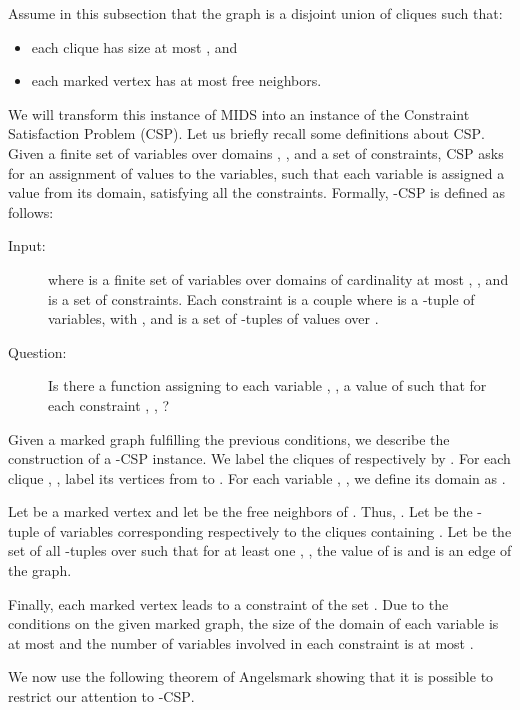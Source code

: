 \documentclass[a4paper,10pt]{article}
\theoremstyle{plain}
\theoremstyle{definition}
\theoremstyle{remark}
\newcommand{\MIDSpb}{\textsc{MIDS}\xspace}
\newcommand{\CSPpb}{\textsc{CSP}\xspace}
\begin{document}
Assume in this subsection that the graph  is a disjoint union of cliques such that:
\begin{itemize}
\item each clique has size at most , and
\item each marked vertex has at most  free neighbors.
\end{itemize}

We will transform this instance  of \MIDSpb into an instance
 of the Constraint Satisfaction Problem (\CSPpb). Let us
briefly recall some definitions about \CSPpb.
Given a finite set  of  variables over domains ,
, and a set  of  constraints, \CSPpb asks for
an assignment of values to the variables, such that each variable is assigned a value from its domain,
satisfying all the constraints.
Formally, -\CSPpb is defined as follows:



\begin{description}
\item[Input:]  where 
is a finite set of variables over domains  of
cardinality at most , ,
and  is a set of constraints.
Each constraint  is a couple 
where  is a -tuple of variables, with ,
and  is a set of -tuples of values over .

\item[Question:] Is there a function  assigning to each variable , ,
a value of  such that for each constraint , ,
 ?
\end{description}


Given a marked graph  fulfilling the previous conditions,
we describe the construction of a -\CSPpb instance.
We label the cliques  of  respectively by .
For each clique , , label its vertices from  to .
For each variable , , we define its domain as .

Let  be a marked vertex and let 
be the free neighbors of . Thus, .
Let  be the -tuple of variables corresponding respectively
to the cliques containing .
Let  be the set of all -tuples 
over 
such that for at least one , , the value of  is 
and  is an edge of the graph.

Finally, each marked vertex  leads to a constraint 
of the set . Due to the conditions on the given marked graph,
the size of the domain of each variable is at most 
and the number of variables involved in each constraint is at most .





We now use the following theorem of Angelsmark \cite{Angelsmark05}
showing that it is possible to restrict our attention to
-\CSPpb.
\end{document}
